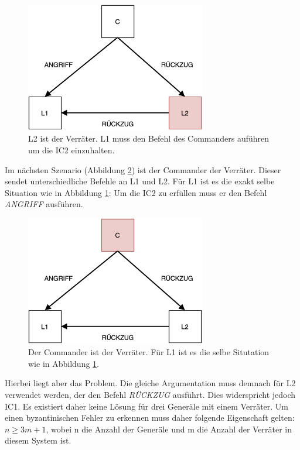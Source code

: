 \documentclass{article}
\begin{document}
\begin{figure}[H]
    \centering
    \includegraphics[width=0.7\textwidth]{general1.png}
    \caption{L2 ist der Verräter. L1 muss den Befehl des Commanders auführen um die IC2 einzuhalten.}
    \label{fig:general1}
\end{figure}

Im nächsten Szenario (Abbildung \ref{fig:general2}) ist der Commander der Verräter. Dieser sendet unterschiedliche 
Befehle an L1 und L2. Für L1 ist es die exakt selbe Situation 
wie in Abbildung \ref{fig:general1}: Um die IC2 zu erfüllen muss er den Befehl \textit{ANGRIFF} ausführen. 

\begin{figure}[H]
    \centering
    \includegraphics[width=0.7\textwidth]{general2.png}
    \caption{Der Commander ist der Verräter. Für L1 ist es die selbe Situtation wie in Abbildung \ref{fig:general1}.}
    \label{fig:general2}
\end{figure}

Hierbei liegt aber das Problem. Die gleiche Argumentation muss demnach für L2
verwendet werden, der den Befehl \textit{RÜCKZUG} ausführt. Dies widerspricht jedoch 
IC1. Es existiert daher keine Lösung für drei Generäle mit einem Verräter. 
Um einen byzantinischen Fehler zu erkennen muss daher folgende Eigenschaft gelten: $n \geq 3m + 1$, 
wobei n die Anzahl der Generäle und m die Anzahl der Verräter in diesem System ist.
\end{document}
